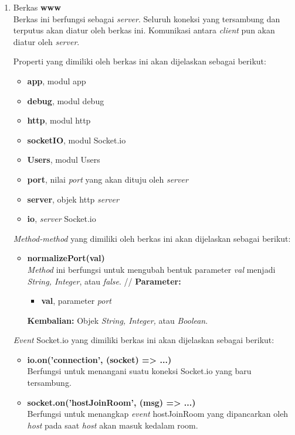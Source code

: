 \begin{enumerate}
\begin{enumerate}
		\item Berkas \textbf{www} \\
		Berkas ini berfungsi sebagai \textit{server}. Seluruh koneksi yang tersambung dan terputus akan diatur oleh berkas ini. Komunikasi antara \textit{client} pun akan diatur oleh \textit{server}.
		
		Properti yang dimiliki oleh berkas ini akan dijelaskan sebagai berikut:
		\begin{itemize}
			\item \textbf{app}, modul app
			\item \textbf{debug}, modul debug
			\item \textbf{http}, modul http
			\item \textbf{socketIO}, modul Socket.io
			\item \textbf{{Users}}, modul Users
			\item \textbf{port}, nilai \textit{port} yang akan dituju oleh \textit{server}
			\item \textbf{server}, objek http \textit{server}
			\item \textbf{io}, \textit{server} Socket.io 
		\end{itemize}
	
		\textit{Method-method} yang dimiliki oleh berkas ini akan dijelaskan sebagai berikut:
		\begin{itemize}
			\item \textbf{normalizePort(val)} \\
			\textit{Method} ini berfungsi untuk mengubah bentuk parameter \textit{val} menjadi \textit{String, Integer}, atau \textit{false}. //
			\textbf{Parameter:}
			\begin{itemize}
				\item \textbf{val}, parameter \textit{port}
			\end{itemize}
			\textbf{Kembalian:} Objek \textit{String, Integer,} atau \textit{Boolean}. 
			
		\end{itemize}
	
		\textit{Event} Socket.io yang dimiliki berkas ini akan dijelaskan sebagai berikut:
		\begin{itemize}
			\item \textbf{io.on('connection', (socket) => {...})} \\
			Berfungsi untuk menangani suatu koneksi Socket.io yang baru tersambung.
			
			\item \textbf{socket.on('hostJoinRoom', (msg) => {...})} \\ 
			Berfungsi untuk menangkap \textit{event} hostJoinRoom yang dipancarkan oleh \textit{host} pada saat \textit{host} akan masuk kedalam room.
			

\end{itemize}
\end{enumerate}
\end{enumerate}
